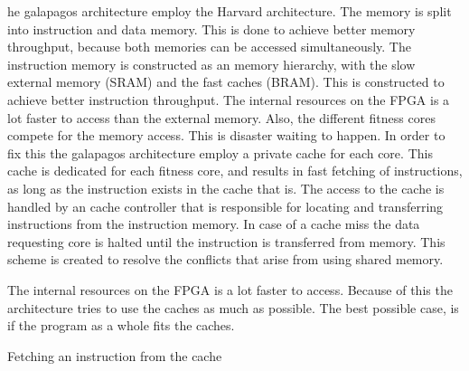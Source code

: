 he galapagos architecture employ the Harvard architecture. The memory is split into instruction and data memory. This is done to achieve better memory throughput, because both memories can be accessed simultaneously. The instruction memory is constructed as an memory hierarchy, with the slow external memory (SRAM) and the fast caches (BRAM). This is constructed to achieve better instruction throughput. The internal resources on the FPGA is a lot faster to access than the external memory. Also, the different fitness cores compete for the memory access. This is disaster waiting to happen. In order to fix this the galapagos architecture employ a private cache for each core. This cache is dedicated for each fitness core, and results in fast fetching of instructions, as long as the instruction exists in the cache that is.  The access to the cache is handled by an cache controller that is responsible for locating and transferring instructions from the instruction memory. In case of a cache miss the data requesting core is halted until the instruction is transferred from memory. This scheme is created to resolve the conflicts that arise from using shared memory. 


The internal resources on the FPGA is a lot faster to access. Because of this the architecture tries to use the caches as much as possible. The best possible case, is if the program as a whole fits the caches.  



\begin{algorithm}[H]
\SetAlgoLined
\DontPrintSemicolon
{}
\Begin{
    \If{$ a = Ca[A \bmod{512}] $}{
        \Return{$ Ci[A \bmod{512}] $}
    }\Else{
        $ Caa \bmod{512}] \longleftarrow a $\;
        $ Ci[a \bmod{512}] \longleftarrow M[a] $\;
        \Return{$ Ci[A \bmod{512}] $}
    }
}
\caption{Fetching an instruction from the cache}
\label{algorithm:cache-operation}
\end{algorithm}
